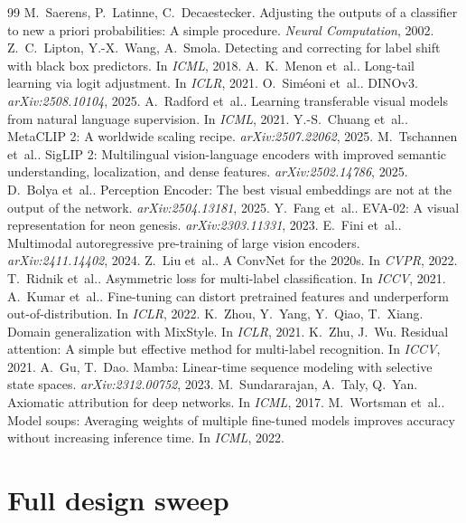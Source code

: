 \documentclass[10pt,twocolumn,letterpaper]{article}
\newcommand{\etal}{et~al.}
\begin{document}
{\begin{thebibliography}{99}
 M.~Saerens, P.~Latinne, C.~Decaestecker. Adjusting the outputs of a classifier to new a priori probabilities: A simple procedure. \textit{Neural Computation}, 2002.
 Z.~C.~Lipton, Y.-X.~Wang, A.~Smola. Detecting and correcting for label shift with black box predictors. In \textit{ICML}, 2018.
 A.~K.~Menon \etal. Long-tail learning via logit adjustment. In \textit{ICLR}, 2021.
 O.~Sim\'eoni \etal. DINOv3. \textit{arXiv:2508.10104}, 2025.
 A.~Radford \etal. Learning transferable visual models from natural language supervision. In \textit{ICML}, 2021.
 Y.-S.~Chuang \etal. MetaCLIP 2: A worldwide scaling recipe. \textit{arXiv:2507.22062}, 2025.
 M.~Tschannen \etal. SigLIP 2: Multilingual vision-language encoders with improved semantic understanding, localization, and dense features. \textit{arXiv:2502.14786}, 2025.
 D.~Bolya \etal. Perception Encoder: The best visual embeddings are not at the output of the network. \textit{arXiv:2504.13181}, 2025.
 Y.~Fang \etal. EVA-02: A visual representation for neon genesis. \textit{arXiv:2303.11331}, 2023.
 E.~Fini \etal. Multimodal autoregressive pre-training of large vision encoders. \textit{arXiv:2411.14402}, 2024.
 Z.~Liu \etal. A ConvNet for the 2020s. In \textit{CVPR}, 2022.
 T.~Ridnik \etal. Asymmetric loss for multi-label classification. In \textit{ICCV}, 2021.
 A.~Kumar \etal. Fine-tuning can distort pretrained features and underperform out-of-distribution. In \textit{ICLR}, 2022.
 K.~Zhou, Y.~Yang, Y.~Qiao, T.~Xiang. Domain generalization with MixStyle. In \textit{ICLR}, 2021.
 K.~Zhu, J.~Wu. Residual attention: A simple but effective method for multi-label recognition. In \textit{ICCV}, 2021.
 A.~Gu, T.~Dao. Mamba: Linear-time sequence modeling with selective state spaces. \textit{arXiv:2312.00752}, 2023.
 M.~Sundararajan, A.~Taly, Q.~Yan. Axiomatic attribution for deep networks. In \textit{ICML}, 2017.
 M.~Wortsman \etal. Model soups: Averaging weights of multiple fine-tuned models improves accuracy without increasing inference time. In \textit{ICML}, 2022.
\end{thebibliography}
}

\clearpage
\appendix
\onecolumn
\section{Full design sweep}
\label{app:sweep}
\end{document}
